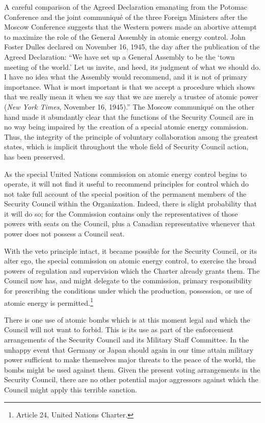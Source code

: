 A careful comparison of the Agreed Declaration emanating from the Potomac Conference and the joint communiqu\'e of the three Foreign Ministers after the Moscow Conference suggests that the Western powers made an abortive attempt to maximize the role of the General Assembly in atomic energy control. John Foster Dulles declared on November 16, 1945, the day after the publication of the Agreed Declaration: ``We have set up a General Assembly to be the `town meeting of the world.' Let us invite, and heed, its judgment of what we should do. I have no idea what the Assembly would recommend, and it is not of primary importance. What is most important is that we accept a procedure which shows that we really mean it when we say that we are merely a trustee of atomic power (\textit{New York Times}, November 16, 1945).'' The Moscow communiqu\'e on the other hand made it abundantly clear that the functions of the Security Council are in no way being impaired by the creation of a special atomic energy commission. Thus, the integrity of the principle of voluntary collaboration among the greatest states, which is implicit throughout the whole field of Security Council action, has been preserved.

As the special United Nations commission on atomic energy control begins to operate, it will not find it useful to recommend principles for control which do not take full account of the special position of the permanent members of the Security Council within the Organization. Indeed, there is slight probability that it will do so; for the Commission contains only the representatives of those powers with seats on the Council, plus a Canadian representative whenever that power does not possess a Council seat.

With the veto principle intact, it became possible for the Security Council, or its alter ego, the special commission on atomic energy control, to exercise the broad powers of regulation and supervision which the Charter already grants them. The Council now has, and might delegate to the commission, primary responsibility for prescribing the conditions under which the production, possession, or use of atomic energy is permitted.\footnote{Article 24, United Nations Charter.}

There is one use of atomic bombs which is at this moment legal and which the Council will not want to forbid. This is its use as part of the enforcement arrangements of the Security Council and its Military Staff Committee. In the unhappy event that Germany or Japan should again in our time attain military power sufficient to make themselves major threats to the peace of the world, the bombs might be used against them. Given the present voting arrangements in the Security Council, there are no other potential major aggressors against which the Council might apply this terrible sanction.

